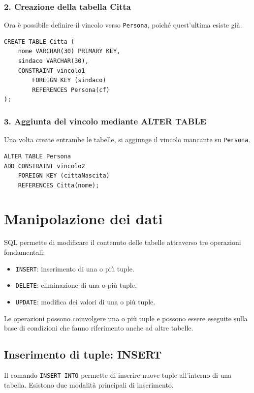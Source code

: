\subsubsection*{2. Creazione della tabella Citta}
Ora è possibile definire il vincolo verso \texttt{Persona}, poiché quest'ultima esiste già.
\begin{verbatim}
CREATE TABLE Citta (
    nome VARCHAR(30) PRIMARY KEY,
    sindaco VARCHAR(30),
    CONSTRAINT vincolo1
        FOREIGN KEY (sindaco)
        REFERENCES Persona(cf)
);
\end{verbatim}
\subsubsection*{3. Aggiunta del vincolo mediante ALTER TABLE}
Una volta create entrambe le tabelle, si aggiunge il vincolo mancante su \texttt{Persona}.
\begin{verbatim}
ALTER TABLE Persona
ADD CONSTRAINT vincolo2
    FOREIGN KEY (cittaNascita)
    REFERENCES Citta(nome);
\end{verbatim}

\section{Manipolazione dei dati}
SQL permette di modificare il contenuto delle tabelle attraverso tre operazioni fondamentali:
\begin{itemize}
    \item \texttt{INSERT}: inserimento di una o più tuple.
    \item \texttt{DELETE}: eliminazione di una o più tuple.
    \item \texttt{UPDATE}: modifica dei valori di una o più tuple.
\end{itemize}
\noindent Le operazioni possono coinvolgere una o più tuple e possono essere eseguite sulla base di condizioni che fanno riferimento anche ad altre tabelle.
\subsection{Inserimento di tuple: INSERT}
Il comando \texttt{INSERT INTO} permette di inserire nuove tuple all'interno di una tabella.
Esistono due modalità principali di inserimento.
